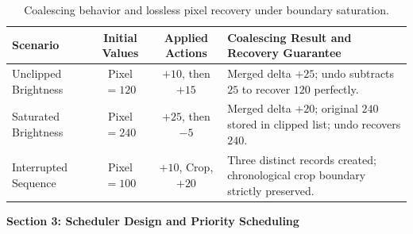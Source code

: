 \documentclass[10pt,a4paper]{article}
\begin{document}
\vspace{0.4cm}
\begin{table}[h!]
\centering
\small
\begin{tabularx}{\textwidth}{l c c X}
\toprule
\textbf{Scenario} & \textbf{Initial Values} & \textbf{Applied Actions} & \textbf{Coalescing Result and Recovery Guarantee} \\
\midrule
Unclipped Brightness & Pixel $= 120$ & $+10$, then $+15$ & Merged delta $+25$; undo subtracts $25$ to recover $120$ perfectly. \\
\addlinespace[3pt]
Saturated Brightness & Pixel $= 240$ & $+25$, then $-5$ & Merged delta $+20$; original $240$ stored in clipped list; undo recovers $240$. \\
\addlinespace[3pt]
Interrupted Sequence & Pixel $= 100$ & $+10$, Crop, $+20$ & Three distinct records created; chronological crop boundary strictly preserved. \\
\bottomrule
\end{tabularx}
\caption{Coalescing behavior and lossless pixel recovery under boundary saturation.}
\end{table}

\clearpage


\begin{center}
    {\Large \textbf{Section 3: Scheduler Design and Priority Scheduling}}
\end{center}
\end{document}
